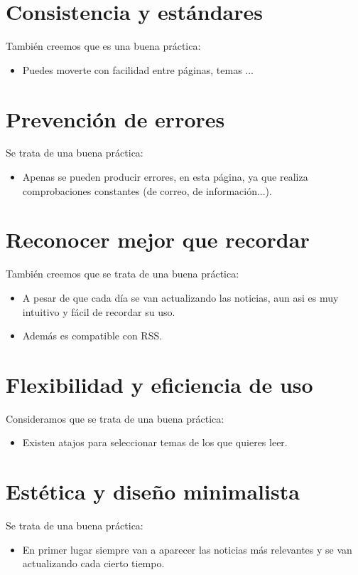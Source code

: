 \documentclass[openany,overnay,a4paper, twoside, 14pt]{book}
\begin{document}
\section*{Consistencia y estándares}
También creemos que es una buena práctica:
\begin{itemize}
\item Puedes moverte con facilidad entre páginas, temas ...
\end{itemize}
\section*{Prevención de errores}
Se trata de una buena práctica:
\begin{itemize}
\item Apenas se pueden producir errores, en esta página, ya que realiza comprobaciones constantes (de correo, de información...).
\end{itemize}

\section*{Reconocer mejor que recordar}
También creemos que se trata de una buena práctica:
\begin{itemize}
\item A pesar de que cada día se van actualizando las noticias, aun asi es muy intuitivo y fácil de recordar su uso.
\item Además es compatible con RSS.
\end{itemize}
\section*{Flexibilidad y eficiencia de uso}
Consideramos que se trata de una buena práctica:
\begin{itemize}
\item Existen atajos para seleccionar temas de los que quieres leer.
\end{itemize}
\section*{Estética y diseño minimalista}
Se trata de una buena práctica:
\begin{itemize}
\item En primer lugar siempre van a aparecer las noticias más relevantes y se van actualizando cada cierto tiempo.
\end{itemize}
\end{document}
